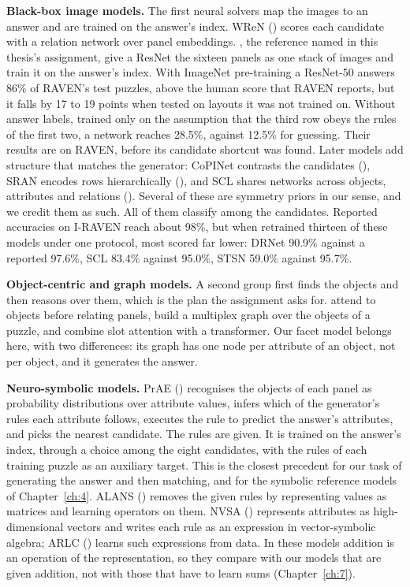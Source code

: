 \textbf{Black-box image models.} The first neural solvers map the images to an answer and are trained on the answer's index. WReN (\citealp{barrett2018measuring}) scores each candidate with a relation network over panel embeddings. \citet{zhuo2020solving}, the reference named in this thesis's assignment, give a ResNet the sixteen panels as one stack of images and train it on the answer's index. With ImageNet pre-training a ResNet-50 answers 86\% of RAVEN's test puzzles, above the human score that RAVEN reports, but it falls by 17 to 19 points when tested on layouts it was not trained on. Without answer labels, trained only on the assumption that the third row obeys the rules of the first two, a network reaches 28.5\%, against 12.5\% for guessing. Their results are on RAVEN, before its candidate shortcut was found. Later models add structure that matches the generator: CoPINet contrasts the candidates (\citealp{zhang2019learning}), SRAN encodes rows hierarchically (\citealp{hu2021stratified}), and SCL shares networks across objects, attributes and relations (\citealp{wu2020scattering}). Several of these are symmetry priors in our sense, and we credit them as such. All of them classify among the candidates. Reported accuracies on I-RAVEN reach about 98\%, but when \citet{malkinski2025airaven} retrained thirteen of these models under one protocol, most scored far lower: DRNet 90.9\% against a reported 97.6\%, SCL 83.4\% against 95.0\%, STSN 59.0\% against 95.7\%.

\textbf{Object-centric and graph models.} A second group first finds the objects and then reasons over them, which is the plan the assignment asks for. \citet{spratley2020closer} attend to objects before relating panels, \citet{wang2020abstract} build a multiplex graph over the objects of a puzzle, and \citet{mondal2023learning} combine slot attention with a transformer. Our facet model belongs here, with two differences: its graph has one node per attribute of an object, not per object, and it generates the answer.

\textbf{Neuro-symbolic models.} PrAE (\citealp{zhang2021abstract}) recognises the objects of each panel as probability distributions over attribute values, infers which of the generator's rules each attribute follows, executes the rule to predict the answer's attributes, and picks the nearest candidate. The rules are given. It is trained on the answer's index, through a choice among the eight candidates, with the rules of each training puzzle as an auxiliary target. This is the closest precedent for our task of generating the answer and then matching, and for the symbolic reference models of Chapter~\ref{ch:4}. ALANS (\citealp{zhang2022learning}) removes the given rules by representing values as matrices and learning operators on them. NVSA (\citealp{hersche2023neuro}) represents attributes as high-dimensional vectors and writes each rule as an expression in vector-symbolic algebra; ARLC (\citealp{camposampiero2024towards}) learns such expressions from data. In these models addition is an operation of the representation, so they compare with our models that are given addition, not with those that have to learn sums (Chapter~\ref{ch:7}).

